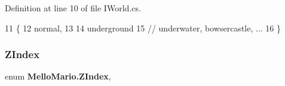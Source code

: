 Definition at line 10 of file I\+World.\+cs.


\begin{DoxyCode}
11     \{
12         normal,
13 
14         underground
15         \textcolor{comment}{// underwater, bowsercastle, ...}
16     \}
\end{DoxyCode}
\mbox{\label{namespaceMelloMario_ab729909e4c525d69f7c5d72d5184a9b8}} 
\subsubsection{Z\+Index}
{\footnotesize\ttfamily enum \textbf{ Mello\+Mario.\+Z\+Index}\hspace{0.3cm}{\ttfamily [strong]}, {\ttfamily [package]}}


